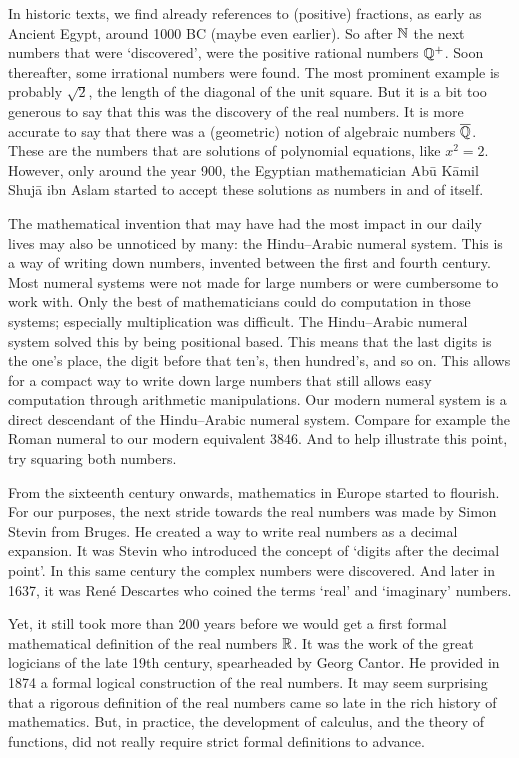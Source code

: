 In historic texts, we find already references to (positive) fractions, as early as Ancient Egypt, around 1000 BC (maybe even earlier). So after $\mathbb{N}$ the next numbers that were `discovered', were the positive rational numbers $\mathbb{Q}^+$. Soon thereafter, some irrational numbers were found. The most prominent example is probably $\sqrt{2}$, the length of the diagonal of the unit square. But it is a bit too generous to say that this was the discovery of the real numbers. It is more accurate to say that there was a (geometric) notion of algebraic numbers $\overline{\mathbb{Q}}$. These are the numbers that are solutions of polynomial equations, like $x^2 = 2$. However, only around the year 900, the Egyptian mathematician Abū Kāmil Shujā ibn Aslam started to accept these solutions as numbers in and of itself.

The mathematical invention that may have had the most impact in our daily lives may also be unnoticed by many: the Hindu--Arabic numeral system. This is a way of writing down numbers, invented between the first and fourth century. Most numeral systems were not made for large numbers or were cumbersome to work with. Only the best of mathematicians could do computation in those systems; especially multiplication was difficult. The Hindu--Arabic numeral system solved this by being positional based. This means that the last digits is the one's place, the digit before that ten's, then hundred's, and so on. This allows for a compact way to write down large numbers that still allows easy computation through arithmetic manipulations. Our modern numeral system is a direct descendant of the Hindu--Arabic numeral system. Compare for example the Roman numeral \uppercase\expandafter{\relax} to our modern equivalent $3846$. And to help illustrate this point, try squaring both numbers.

From the sixteenth century onwards, mathematics in Europe started to flourish. For our purposes, the next stride towards the real numbers was made by Simon Stevin from Bruges. He created a way to write real numbers as a decimal expansion. It was Stevin who introduced the concept of `digits after the decimal point'. In this same century the complex numbers were discovered. And later in 1637, it was René Descartes who coined the terms `real' and `imaginary' numbers.

Yet, it still took more than 200 years before we would get a first formal mathematical definition of the real numbers $\mathbb{R}$. It was the work of the great logicians of the late 19th century, spearheaded by Georg Cantor. He provided in 1874 a formal logical construction of the real numbers. It may seem surprising that a rigorous definition of the real numbers came so late in the rich history of mathematics. But, in practice, the development of calculus, and the theory of functions, did not really require strict formal definitions to advance.

